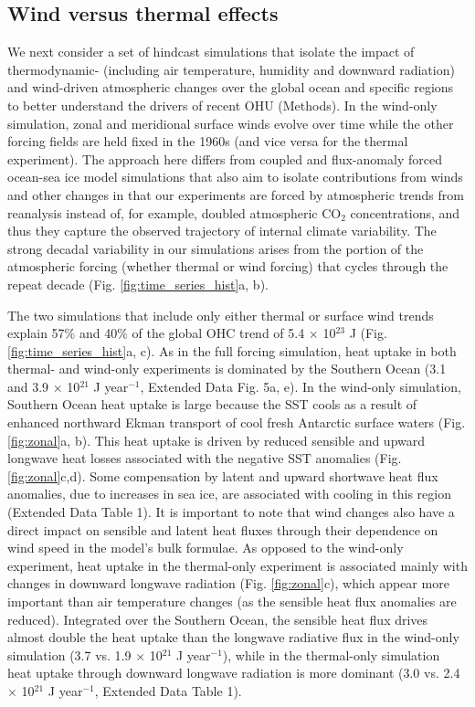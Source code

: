 \documentclass{nature}
\begin{document}
	\subsection{Wind versus thermal effects}
	We next consider a set of hindcast simulations that isolate the impact of thermodynamic- (including air temperature, humidity and downward radiation) and wind-driven atmospheric changes over the global ocean and specific regions to better understand the drivers of recent OHU (Methods). In the wind-only simulation, zonal and meridional surface winds evolve over time while the other forcing fields are held fixed in the 1960s (and vice versa for the thermal experiment). The approach here differs from coupled and flux-anomaly forced ocean-sea ice model simulations that also aim to isolate contributions from winds and other changes\cite{gregory2016FAFMIP,todd2020oceanFAFMIP} in that our experiments are forced by atmospheric trends from reanalysis instead of, for example, doubled atmospheric CO$_2$ concentrations, and thus they capture the observed trajectory of internal climate variability. The strong decadal variability in our simulations arises from the portion of the atmospheric forcing (whether thermal or wind forcing) that cycles through the repeat decade (Fig. \ref{fig:time_series_hist}a, b).
	
	The two simulations that include only either thermal or surface wind trends explain 57\% and 40\% of the global OHC trend of 5.4 $\times$ 10$^{23}$ J (Fig. \ref{fig:time_series_hist}a, c). As in the full forcing simulation, heat uptake in both thermal- and wind-only experiments is dominated by the Southern Ocean (3.1 and 3.9 $\times$ 10$^{21}$ J year$^{-1}$, Extended Data Fig. 5a, e). In the wind-only simulation, Southern Ocean heat uptake is large because the SST cools as a result of enhanced northward Ekman transport of cool fresh Antarctic surface waters (Fig. \ref{fig:zonal}a, b). This heat uptake is driven by reduced sensible and upward longwave heat losses associated with the negative SST anomalies (Fig. \ref{fig:zonal}c,d). Some compensation by latent and upward shortwave heat flux anomalies, due to increases in sea ice, are associated with cooling in this region\cite{wendler1997radbudget_sice} (Extended Data Table 1). It is important to note that wind changes also have a direct impact on sensible and latent heat fluxes through their dependence on wind speed in the model's bulk formulae. As opposed to the wind-only experiment, heat uptake in the thermal-only experiment is associated mainly with changes in downward longwave radiation (Fig. \ref{fig:zonal}c), which appear more important than air temperature changes (as the sensible heat flux anomalies are reduced). Integrated over the Southern Ocean, the sensible heat flux drives almost double the heat uptake than the longwave radiative flux in the wind-only simulation (3.7 vs. 1.9 $\times$ 10$^{21}$ J year$^{-1}$), while in the thermal-only simulation heat uptake through downward longwave radiation is more dominant (3.0 vs. 2.4 $\times$ 10$^{21}$ J year$^{-1}$, Extended Data Table 1). 
	
\end{document}
